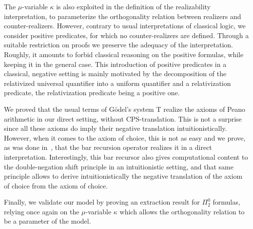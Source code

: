 \documentclass{CSML}
\begin{document}
The $\mu$-variable $\kappa$ is also exploited in the definition of the realizability interpretation, to parameterize the orthogonality relation between realizers and counter-realizers. However, contrary to usual interpretations of classical logic, we consider positive predicates, for which no counter-realizers are defined. Through a suitable restriction on proofs we preserve the adequacy of the interpretation. Roughly, it amounts to forbid classical reasoning on the positive formulas, while keeping it in the general case. This introduction of positive predicates in a classical, negative setting is mainly motivated by the decomposition of the relativized universal quantifier into a uniform quantifier and a relativization predicate, the relativization predicate being a positive one.\par
We proved that the usual terms of G\"odel's system T realize the axioms of Peano arithmetic in our direct setting, without CPS-translation. This is not a surprise since all these axioms do imply their negative translation intuitionistically. However, when it comes to the axiom of choice, this is not as easy and we prove, as was done in~\cite{BlotRibaBarRec}, that the bar recursion operator realizes it in a direct interpretation. Interestingly, this bar recursor also gives computational content to the double-negation shift principle in an intuitionistic setting, and that same principle allows to derive intuitionistically the negative translation of the axiom of choice from the axiom of choice.\par
Finally, we validate our model by proving an extraction result for $\Pi^0_2$ formulas, relying once again on the $\mu$-variable $\kappa$ which allows the orthogonality relation to be a parameter of the model.
\end{document}
